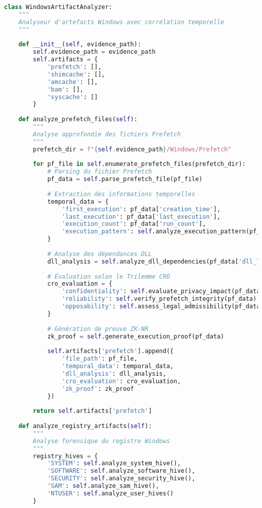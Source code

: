 \begin{lstlisting}[language=Python, caption=Analyseur Prefetch avec intelligence temporelle]
class WindowsArtifactAnalyzer:
    """
    Analyseur d'artefacts Windows avec corrélation temporelle
    """
    
    def __init__(self, evidence_path):
        self.evidence_path = evidence_path
        self.artifacts = {
            'prefetch': [],
            'shimcache': [],
            'amcache': [],
            'bam': [],
            'syscache': []
        }
        
    def analyze_prefetch_files(self):
        """
        Analyse approfondie des fichiers Prefetch
        """
        prefetch_dir = f"{self.evidence_path}/Windows/Prefetch"
        
        for pf_file in self.enumerate_prefetch_files(prefetch_dir):
            # Parsing du fichier Prefetch
            pf_data = self.parse_prefetch_file(pf_file)
            
            # Extraction des informations temporelles
            temporal_data = {
                'first_execution': pf_data['creation_time'],
                'last_execution': pf_data['last_execution'],
                'execution_count': pf_data['run_count'],
                'execution_pattern': self.analyze_execution_pattern(pf_data)
            }
            
            # Analyse des dépendances DLL
            dll_analysis = self.analyze_dll_dependencies(pf_data['dll_list'])
            
            # Évaluation selon le Trilemme CRO
            cro_evaluation = {
                'confidentiality': self.evaluate_privacy_impact(pf_data),
                'reliability': self.verify_prefetch_integrity(pf_data),
                'opposability': self.assess_legal_admissibility(pf_data)
            }
            
            # Génération de preuve ZK-NR
            zk_proof = self.generate_execution_proof(pf_data)
            
            self.artifacts['prefetch'].append({
                'file_path': pf_file,
                'temporal_data': temporal_data,
                'dll_analysis': dll_analysis,
                'cro_evaluation': cro_evaluation,
                'zk_proof': zk_proof
            })
            
        return self.artifacts['prefetch']
    
    def analyze_registry_artifacts(self):
        """
        Analyse forensique du registre Windows
        """
        registry_hives = {
            'SYSTEM': self.analyze_system_hive(),
            'SOFTWARE': self.analyze_software_hive(),
            'SECURITY': self.analyze_security_hive(),
            'SAM': self.analyze_sam_hive(),
            'NTUSER': self.analyze_user_hives()
        }
        

\end{lstlisting}
